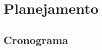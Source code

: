 \documentclass[
	12pt,				%
	openright,			%
	twoside,			%
	a4paper,			%
	english,			%
	brazil,				%
	]{abntex2}
\begin{document}





\chapter{Planejamento}

\section{Cronograma}

\newcommand{\cc}{\cellcolor{black!25}}  %
\end{document}
